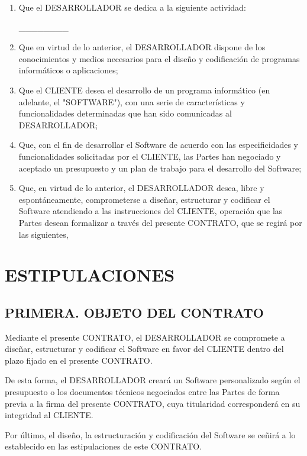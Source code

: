 \documentclass[a4paper,11pt]{report}
\begin{document}
	\begin{enumerate}[label=\roman*.]
		\item Que el DESARROLLADOR se dedica a la siguiente actividad:

			\_\_\_\_\_\_\_\_

		\item Que en virtud de lo anterior, el DESARROLLADOR dispone de los
		conocimientos y medios necesarios para el diseño y codificación de
		programas informáticos o aplicaciones;

		\item Que el CLIENTE desea el desarrollo de un programa informático (en
		adelante, el "SOFTWARE"), con una serie de características y
		funcionalidades determinadas que han sido comunicadas al DESARROLLADOR;

		\item Que, con el fin de desarrollar el Software de acuerdo con las
		especificidades y funcionalidades solicitadas por el CLIENTE, las Partes
		han negociado y aceptado un presupuesto y un plan de trabajo para el
		desarrollo del Software;

		\item Que, en virtud de lo anterior, el DESARROLLADOR desea, libre y
		espontáneamente, comprometerse a diseñar, estructurar y codificar el
		Software atendiendo a las instrucciones del CLIENTE, operación que las
		Partes desean formalizar a través del presente CONTRATO, que se regirá
		por las siguientes,
	\end{enumerate}

	\section*{ESTIPULACIONES}

	\subsection*{PRIMERA. OBJETO DEL CONTRATO}

	Mediante el presente CONTRATO, el DESARROLLADOR se compromete a diseñar,
	estructurar y codificar el Software en favor del CLIENTE dentro del
	plazo fijado en el presente CONTRATO.

	De esta forma, el DESARROLLADOR creará un Software personalizado según
	el presupuesto o los documentos técnicos negociados entre las Partes de
	forma previa a la firma del presente CONTRATO, cuya titularidad
	corresponderá en su integridad al CLIENTE.

	Por último, el diseño, la estructuración y codificación del Software se
	ceñirá a lo establecido en las estipulaciones de este CONTRATO.
\end{document}
